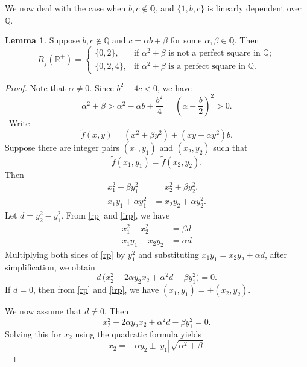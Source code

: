 \documentclass[11pt]{amsart}
\theoremstyle{definition}
\newtheorem{lemma}[theorem]{Lemma}
\begin{document}
 We now deal with the case when $b, c\not\in\mathbb{Q}$, and $\{1, b, c\}$ is linearly dependent over $\mathbb{Q}$.
\begin{lemma}\label{lm:d}
Suppose $b, c\not\in\mathbb{Q}$ and $c=\alpha b+\beta$ for some $\alpha, \beta\in\mathbb{Q}$. Then 
\[
R_{\tilde{f}}(\mathbb{R^{+}})=\begin{cases} \{0, 2\},  & \text{if $\alpha^2+\beta$ is not a perfect square in $\mathbb{Q}$};\\
\{0, 2, 4\},  &\text{if $\alpha^2+\beta$ is a perfect square in $\mathbb{Q}$.}
\end{cases}
\]
\end{lemma}

\begin{proof} Note that $\alpha\not=0$. Since $b^2-4c<0$, we have 
\[
\alpha^2+\beta>\alpha^2-\alpha b+\frac{b^2}4=(\alpha-\frac{b}2)^2>0.
\]
\
Write 
\begin{equation}\label{m}
\tilde  f(x,y) = (x^2 + \beta y^2)+(xy + \alpha y^2)b.
\end{equation}
Suppose there are integer pairs $(x_1,y_1)$ and $(x_2,y_2)$ such that
\begin{equation}\label{mm}
\tilde  f(x_1,y_1) = \tilde f(x_2,y_2).
\end{equation}
Then 
\begin{align}
  x_1^2 + \beta y_1^2 &= x_2^2 + \beta y_2^2, \label{rp}\\
  x_1 y_1 + \alpha y_1^2 &= x_2 y_2 + \alpha y_2^2. \label{irp}
\end{align}
Let $d=y_2^2-y_1^2$. From \eqref{rp} and \eqref{irp}, we have
\begin{align}
  x_1^2 - x_2^2 &= \beta d \label{rp2}\\
  x_1 y_1 - x_2 y_2 &= \alpha d \label{rp3}
\end{align}
Multiplying both sides of \eqref{rp} by $y_1^2$ and substituting $x_1 y_1 = x_2 y_2 + \alpha d$, after simplification, we obtain
\begin{equation}\label{qq}
  d\,\big( x^2_2 + 2\alpha y_2x_2 + \alpha^2 d - \beta y^2_1 \big) = 0. 
\end{equation}
If $d=0$, then from \eqref{rp} and \eqref{irp}, we have $(x_1,y_1) = \pm (x_2, y_2)$.

We now assume that $d\not=0$. Then 
$$
x^2_2 + 2\alpha y_2x_2 + \alpha^2 d - \beta y^2_1 = 0. 
$$
Solving this for $x_2$ using the quadratic formula yields
\begin{equation}
  x_2 = -\alpha y_2 \pm|y_1|\sqrt{\alpha^2 + \beta}. \label{qf}
\end{equation}


\end{proof}
\end{document}
